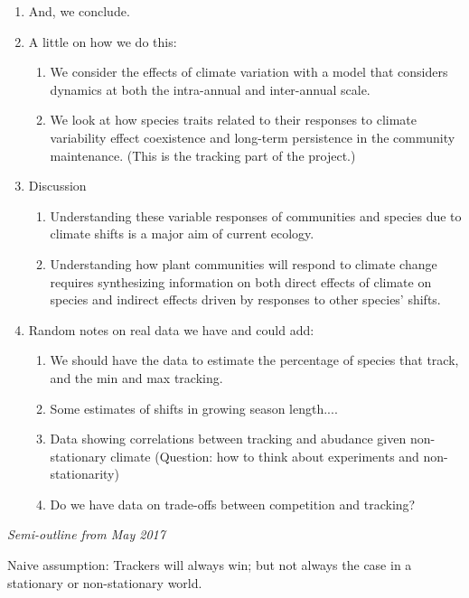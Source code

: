 \documentclass[11pt,letterpaper]{article}
\renewcommand{\subsection}[1]{%
\bigskip
\begin{center}
\begin{large}
\normalfont\itshape #1
\end{large}
\end{center}}
\begin{document}
\begin{enumerate}
\item And, we conclude.
\item A little on how we do this:
\begin{enumerate}
\item We consider the effects of climate variation with a model that considers dynamics at both the
intra-annual and inter-annual scale. 
\item We look at how species traits related to their responses to
  climate variability effect coexistence and long-term persistence in the community
  maintenance. (This is the tracking part of the project.) 
\end{enumerate}
\item Discussion 
\begin{enumerate}
\item Understanding these variable responses of communities and species
  due to climate shifts is a major aim of current ecology.
\item Understanding how plant communities will respond to climate change
requires synthesizing information on both direct effects of climate on species
and indirect effects driven by responses to other species'
shifts. 
\end{enumerate}
\item Random notes on real data we have and could add:
\begin{enumerate}
\item We should have the data to estimate the
percentage of species that track, and the min and max tracking.
\item Some estimates of shifts in growing season length....
\item Data showing correlations between tracking and abudance given non-stationary climate (Question: how to think about experiments and non-stationarity)
\item Do we have data on trade-offs between competition and tracking? 
\end{enumerate}
\end{enumerate}



\subsection{Semi-outline from May 2017} Naive assumption: Trackers will always win; but not always the case in a stationary or non-stationary world. 
\end{document}
